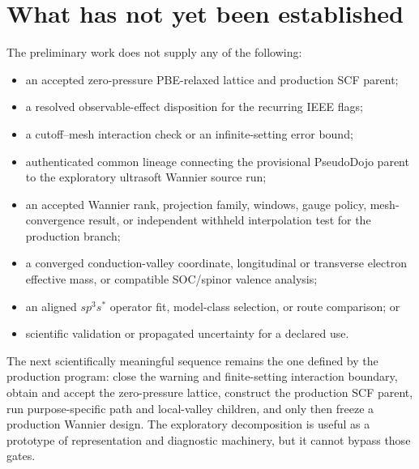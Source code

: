 \section{What has not yet been established}

The preliminary work does not supply any of the following:

\begin{itemize}
  \item an accepted zero-pressure PBE-relaxed lattice and production SCF parent;
  \item a resolved observable-effect disposition for the recurring IEEE flags;
  \item a cutoff--mesh interaction check or an infinite-setting error bound;
  \item authenticated common lineage connecting the provisional PseudoDojo
        parent to the exploratory ultrasoft Wannier source run;
  \item an accepted Wannier rank, projection family, windows, gauge policy,
        mesh-convergence result, or independent withheld interpolation test for
        the production branch;
  \item a converged conduction-valley coordinate, longitudinal or transverse
        electron effective mass, or compatible SOC/spinor valence analysis;
  \item an aligned $sp^3s^{\ast}$ operator fit, model-class selection, or route
        comparison; or
  \item scientific validation or propagated uncertainty for a declared use.
\end{itemize}

The next scientifically meaningful sequence remains the one defined by the
production program: close the warning and finite-setting interaction boundary,
obtain and accept the zero-pressure lattice, construct the production SCF
parent, run purpose-specific path and local-valley children, and only then
freeze a production Wannier design. The exploratory decomposition is useful as
a prototype of representation and diagnostic machinery, but it cannot bypass
those gates.
